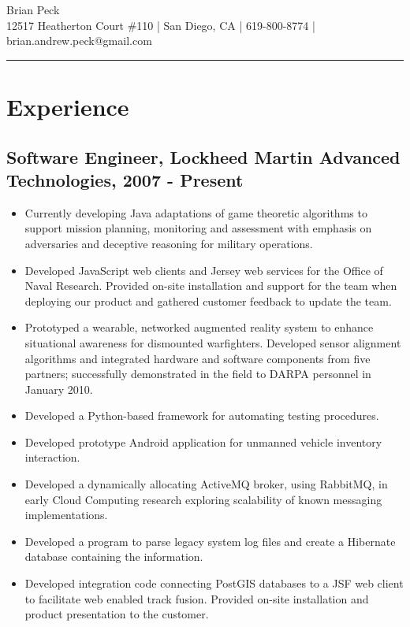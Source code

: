 \documentclass[11pt]{article}
\title{}
\date{}
\begin{document}
\begin{center}
{\huge Brian Peck} \\
12517 Heatherton Court \#110 | San Diego, CA | 619-800-8774 | brian.andrew.peck@gmail.com
\hrule
\end{center}

\section*{Experience}
\label{sec-1}

\subsection*{Software Engineer, Lockheed Martin Advanced Technologies, 2007 - Present}
\label{sec-1.1}

\begin{itemize}
\item Currently developing Java adaptations of game theoretic algorithms to support mission planning, monitoring and assessment with emphasis on adversaries and deceptive reasoning for military operations.
\item Developed JavaScript web clients and Jersey web services for the Office of Naval Research. Provided on-site installation and support for the team when deploying our product and gathered customer feedback to update the team.
\item Prototyped a wearable, networked augmented reality system to enhance situational awareness for dismounted warfighters.  Developed sensor alignment algorithms and integrated hardware and software components from five partners; successfully demonstrated in the field to DARPA personnel in January 2010.
\item Developed a Python-based framework for automating testing procedures.
\item Developed prototype Android application for unmanned vehicle inventory interaction.
\item Developed a dynamically allocating ActiveMQ broker, using RabbitMQ, in early Cloud Computing research exploring scalability of known messaging implementations.
\item Developed a program to parse legacy system log files and create a Hibernate database containing the information.
\item Developed integration code connecting PostGIS databases to a JSF web client to facilitate web enabled track fusion. Provided on-site installation and product presentation to the customer.
\end{itemize}
\end{document}
